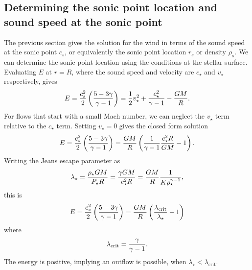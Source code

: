 \documentclass[preprint,12pt]{aastex}
\begin{document}
\subsection{Determining the sonic point location and sound speed at the sonic point}

The previous section gives the solution for the wind in terms of the sound speed at the sonic point $c_s$, or equivalently the sonic point location $r_s$ or density $\rho_s$. We can determine the sonic point location using the conditions at the stellar surface. Evaluating $E$ at $r=R$, where the sound speed and velocity are $c_\star$ and $v_\star$ respectively, gives
\begin{equation}\label{eq:Ewithv}
E = {c_s^2\over 2}\left({5-3\gamma\over \gamma-1}\right) = {1\over 2}v_\star^2 + {c_\star^2\over \gamma-1} - {GM\over R}.
\end{equation}
For flows that start with a small Mach number, we can neglect the $v_\star$ term relative to the $c_\star$ term. Setting $v_\star =0$ gives the closed form solution
\begin{equation}
E = {c_s^2\over 2}\left({5-3\gamma\over \gamma-1}\right) = {GM\over R}\left({1\over \gamma-1}{c_\star^2 R\over GM}-1\right).
\end{equation}
Writing the Jeans escape parameter as 
\begin{equation}
\lambda_\star = {\rho_\star GM\over P_\star R} = {\gamma GM\over c_\star^2 R} = {GM\over R} {1\over K\rho_\star^{\gamma-1}},
\end{equation}
this is
\begin{equation}\label{eq:E0}
E = {c_s^2\over 2}\left({5-3\gamma\over \gamma-1}\right) = {GM\over R}\left({\lambda_\mathrm{crit}\over \lambda_\star}-1\right)
\end{equation}
where
\begin{equation}
\lambda_\mathrm{crit} = {\gamma\over\gamma-1}.
\end{equation}
The energy is positive, implying an outflow is possible, when $\lambda_\star < \lambda_\mathrm{crit}$.
\end{document}
